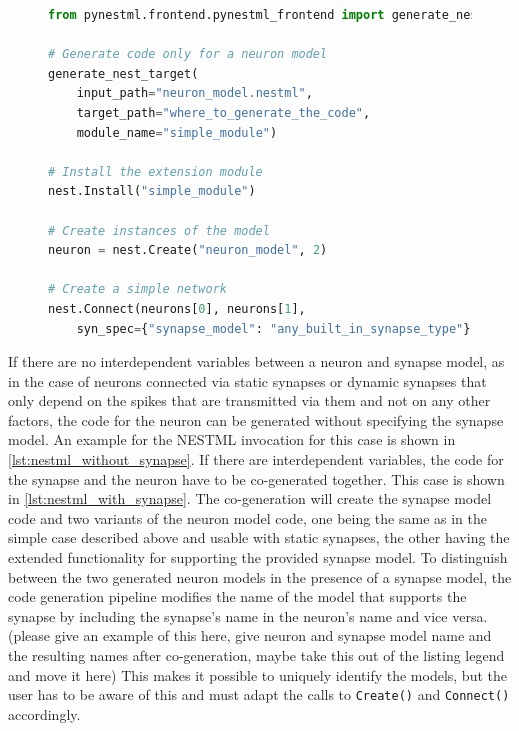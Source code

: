\vspace{2em}
\begin{figure}[ht!]
\centering
\begin{lstlisting}[language=Python, label=lst:nestml_without_synapse, caption={Generating extension module code: The \texttt{generate\_nest\_target()} call for only a neuron model. The minimum required parameter of the function is the \texttt{input\_path} that points to the location of the model. Once the code is generated, the built libraries can be loaded into NEST using the \texttt{Install} function by providing the name of the module (\emph{simple\_module}). Once the model is installed in NEST, we can create instances of the model by calling the \texttt{Create()} function with the model name that was given in the \texttt{neuron} block in the NESTML file.}, captionpos=b]
from pynestml.frontend.pynestml_frontend import generate_nest_target

# Generate code only for a neuron model
generate_nest_target(
    input_path="neuron_model.nestml",
    target_path="where_to_generate_the_code",
    module_name="simple_module")

# Install the extension module
nest.Install("simple_module")

# Create instances of the model
neuron = nest.Create("neuron_model", 2)

# Create a simple network
nest.Connect(neurons[0], neurons[1],
    syn_spec={"synapse_model": "any_built_in_synapse_type"})
\end{lstlisting}
\end{figure}

If there are no interdependent variables between a neuron and synapse model, as in the case of neurons connected via static synapses or dynamic synapses that only depend on the spikes that are transmitted via them and not on any other factors, the code for the neuron can be generated without specifying the synapse model. An example for the NESTML invocation for this case is shown in \autoref{lst:nestml_without_synapse}. If there are interdependent variables, the code for the synapse and the neuron have to be co-generated together. This case is shown in \autoref{lst:nestml_with_synapse}. The co-generation will create the synapse model code and two variants of the neuron model code, one being the same as in the simple case described above and usable with static synapses, the other having the extended functionality for supporting the provided synapse model. To distinguish between the two generated neuron models in the presence of a synapse model, the code generation pipeline modifies the name of the model that supports the synapse by including the synapse's name in the neuron's name and vice versa. (please give an example of this here, give neuron and synapse model name and the resulting names after co-generation, maybe take this out of the listing legend and move it here) This makes it possible to uniquely identify the models, but the user has to be aware of this and must adapt the calls to \texttt{Create()} and \texttt{Connect()} accordingly.

